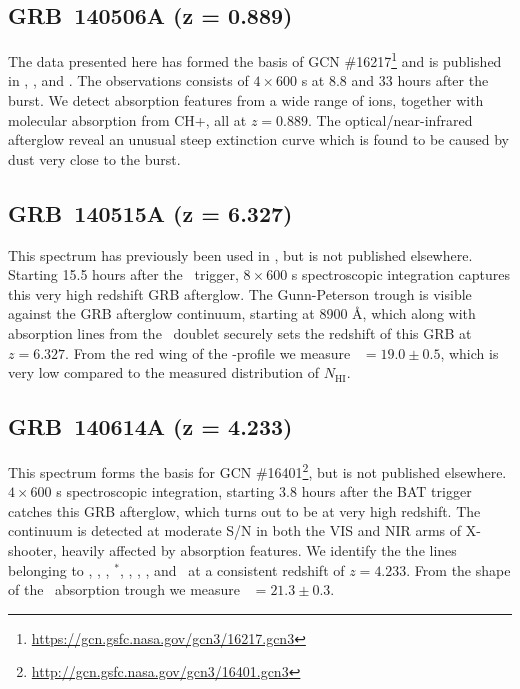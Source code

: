 \documentclass{aa}    %
\begin{document}
\subsection{GRB~140506A  (z = 0.889)} 

The data presented here has formed the basis of GCN
\#16217\footnote{\url{https://gcn.gsfc.nasa.gov/gcn3/16217.gcn3}} and is
published in \citet{Fynbo2014}, \citet{Kruhler2015}, and \citet{Heintz2017a}.
The observations consists of $4\times 600$ s at 8.8 and 33 hours after the
burst. We detect absorption features from a wide range of ions, together with
molecular absorption from CH+, all at $z=0.889$. The optical/near-infrared
afterglow reveal an unusual steep extinction curve which is found to be caused
by dust very close to the burst.

\subsection{GRB~140515A (z = 6.327)}	

This spectrum has previously been used in \citet{Melandri2015}, but is not
published elsewhere. Starting 15.5 hours after the \swift~trigger, $8\times600$
s spectroscopic integration captures this very high redshift GRB afterglow. The
Gunn-Peterson trough is visible against the GRB afterglow continuum, starting at
8900 \AA, which along with absorption lines from the \mgii~doublet securely sets
the redshift of this GRB at $z = 6.327$. From the red wing of the \lya-profile
we measure \nh~$=19.0 \pm 0.5$, which is very low compared to the measured
distribution of $N_{\mathrm{HI}}$.

\subsection{GRB~140614A (z = 4.233)}	

This spectrum forms the basis for GCN
\#16401\footnote{\url{http://gcn.gsfc.nasa.gov/gcn3/16401.gcn3}}, but is not
published elsewhere. $4\times600$ s spectroscopic integration, starting 3.8
hours after the BAT trigger catches this GRB afterglow, which turns out to be at
very high redshift. The continuum is detected at moderate S/N in both the VIS
and NIR arms of X-shooter, heavily affected by absorption features. We identify
the the lines belonging to \lya, \SIii, \cii, \cii$^*$, \alii, \aliii, \feii,
and \mgii~at a consistent redshift of $z = 4.233$. From the shape of the
\lya~absorption trough we measure \nh~$=21.3 \pm 0.3$.
\end{document}
